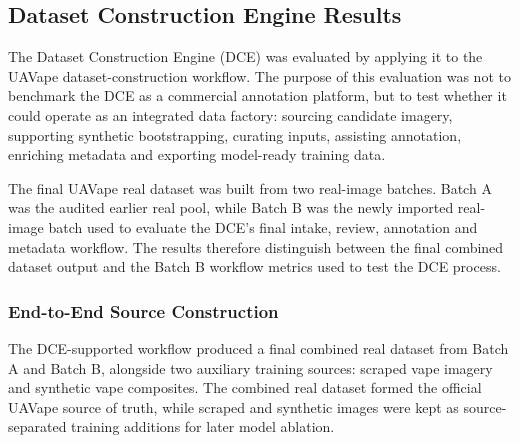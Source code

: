 \subsection{Dataset Construction Engine Results}

The Dataset Construction Engine (DCE) was evaluated by applying it to the UAVape dataset-construction workflow. The purpose of this evaluation was not to benchmark the DCE as a commercial annotation platform, but to test whether it could operate as an integrated data factory: sourcing candidate imagery, supporting synthetic bootstrapping, curating inputs, assisting annotation, enriching metadata and exporting model-ready training data.

The final UAVape real dataset was built from two real-image batches. Batch A was the audited earlier real pool, while Batch B was the newly imported real-image batch used to evaluate the DCE's final intake, review, annotation and metadata workflow. The results therefore distinguish between the final combined dataset output and the Batch B workflow metrics used to test the DCE process.

\subsubsection{End-to-End Source Construction}

The DCE-supported workflow produced a final combined real dataset from Batch A and Batch B, alongside two auxiliary training sources: scraped vape imagery and synthetic vape composites. The combined real dataset formed the official UAVape source of truth, while scraped and synthetic images were kept as source-separated training additions for later model ablation.

